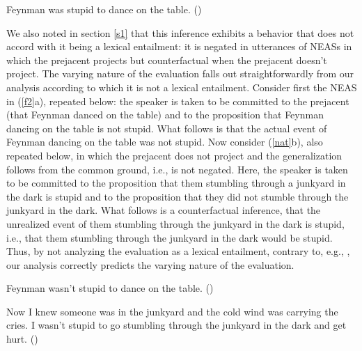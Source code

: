 \documentclass[11pt,fleqn]{article}
\newcommand{\6}{\mbox{$[\hspace*{-.6mm}[$}}
\newcommand{\9}{\mbox{$]\hspace*{-.6mm}]$}}
\begin{document}
\begin{exe} 
\exi{(\ref{f})} Feynman was stupid to dance on the table. \hfill (\citealt[18]{barker02})

\end{exe} 
We also noted in section \ref{s1} that this inference exhibits a behavior that does not accord with it being a lexical entailment: it is negated in utterances of NEASs in which the prejacent projects but counterfactual when the prejacent doesn't project. The varying nature of the evaluation falls out straightforwardly from our analysis according to which it is not a lexical entailment. Consider first the NEAS in  (\ref{f2}a), repeated below: the speaker is taken to be committed to the prejacent (that Feynman danced on the table) and to the proposition that Feynman dancing on the table is not stupid. What follows is that the actual event of Feynman dancing on the table was not stupid. Now consider (\ref{nat}b), also repeated below, in which the prejacent does not project and the generalization follows from the common ground, i.e., is not negated. Here, the speaker is taken to be committed to the proposition that them stumbling through a junkyard in the dark is stupid and to the proposition that they did not stumble through the junkyard in the dark. What follows is a counterfactual inference, that the unrealized event of them stumbling through the junkyard in the dark is stupid, i.e., that them stumbling through the junkyard in the dark would be stupid. Thus, by not analyzing the evaluation as a lexical entailment, contrary to, e.g., \citealt{barker02}, our analysis correctly predicts the varying nature of the evaluation.

\begin{exe}
 Feynman wasn't stupid to dance on the table. \hfill (\citealt[18f.]{barker02})

 Now I knew someone was in the junkyard and the cold wind was
carrying the cries. I wasn't stupid to go stumbling through the
junkyard in the dark and get hurt. \hfill (\citealt[235]{karttunen-etal2014})

\end{exe}
\end{document}
